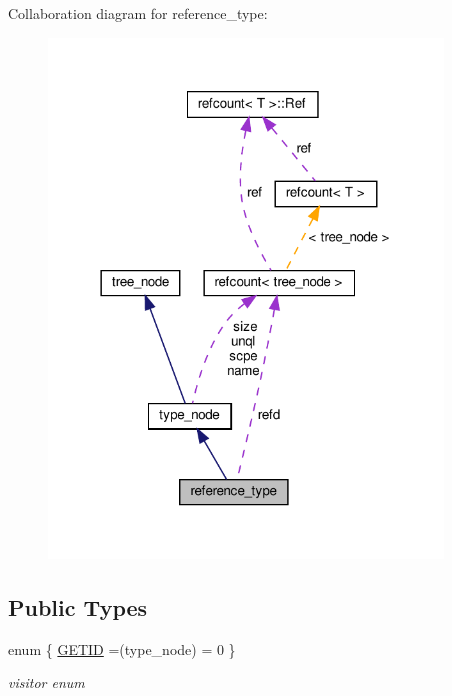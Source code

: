Collaboration diagram for reference\+\_\+type\+:
\nopagebreak
\begin{figure}[H]
\begin{center}
\leavevmode
\includegraphics[width=297pt]{da/d58/structreference__type__coll__graph}
\end{center}
\end{figure}
\subsection*{Public Types}
\begin{DoxyCompactItemize}
\item 
enum \{ \hyperlink{structreference__type_ad64f38915816d3f28900bc26076a263ea1b61513d770869387c9381cbed516040}{G\+E\+T\+ID} =(type\+\_\+node) = 0
 \}\begin{DoxyCompactList}\small\item\em visitor enum \end{DoxyCompactList}
\end{DoxyCompactItemize}
